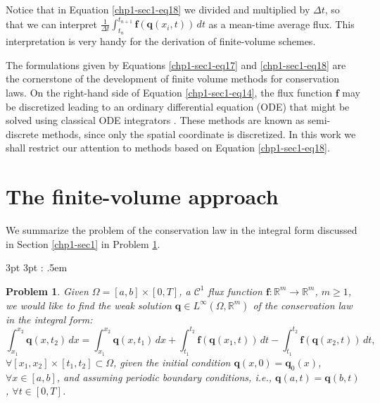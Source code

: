 Notice that in Equation \eqref{chp1-sec1-eq18} we divided and multiplied by $\Delta t$, so that 
we can interpret $\frac{1}{\Delta t}\int_{t_n}^{t_{n+1}}
\mathbf{f}(\mathbf{q}(x_{i}, t)) \,dt $ as a mean-time average flux.
This interpretation is very handy for the derivation of finite-volume schemes.

The formulations given by Equations \eqref{chp1-sec1-eq17} and \eqref{chp1-sec1-eq18} are the cornerstone 
of the development of finite volume methods for conservation laws. 
On the right-hand side of Equation \eqref{chp1-sec1-eq14}, the flux function $\mathbf{f}$ 
may be discretized leading to an ordinary differential equation (ODE)
that might be solved using classical ODE integrators \citep{leveque:2002}. 
These methods are known as semi-discrete methods, since only the spatial coordinate is discretized.
In this work we shall restrict our attention to methods based on Equation \eqref{chp1-sec1-eq18}.

\section{The finite-volume approach}
\label{chp1-sec2}
We summarize the problem of the conservation law in the integral form 
discussed in Section \ref{chp1-sec1} in Problem \ref{chp1-sec2-prob1}.

{3pt} %
{3pt} %
{\itshape} %
{} %
{\bfseries} %
{:} %
{.5em} %
{ } %

\theoremstyle{problem} %
\newtheorem{prob}{Problem}

\begin{prob}
	\label{chp1-sec2-prob1}
	Given $ \Omega = [a,b] \times [0,T]$, a $\mathcal{C}^1$ 
	flux function $\mathbf{f}: \mathbb{R}^m \to \mathbb{R}^m $,
	$m \geq 1$, we would like to find the weak solution
	$ \mathbf{q} \in L^{\infty}(\Omega, \mathbb{R}^m)$ 
	of the conservation law in the integral form:
	\begin{equation*}
	        \int_{x_1}^{x_2} \mathbf{q}(x, t_2) \,dx = 
       		\int_{x_1}^{x_2} \mathbf{q}(x, t_1) \,dx + 
        	\int_{t_1}^{t_2} \mathbf{f}(\mathbf{q}(x_1, t)) \,dt -
		\int_{t_1}^{t_2}\mathbf{f}(\mathbf{q}(x_2, t)) \,dt ,
	\end{equation*}
	$\forall [x_1, x_2]\times[t_1, t_2] \subset \Omega$, 
	given the initial condition 
	$\mathbf{q}(x,0) = \mathbf{q}_0(x)$, $\forall x \in [a,b]$, 
	and assuming periodic boundary conditions, 
	\textit{i.e.}, $\mathbf{q}(a,t) = \mathbf{q}(b,t)$, $\forall t \in [0,T]$.
\end{prob}

